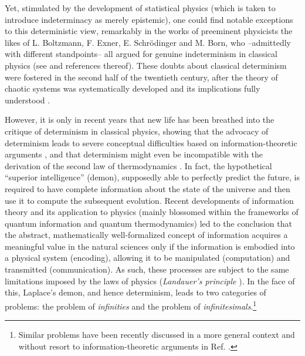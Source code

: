 \documentclass[aps,prl,twocolumn,showpacs,superscriptaddress,groupedaddress, nofootinbib]{revtex4-1}
\begin{document}
Yet, stimulated by the development of statistical physics (which is taken to introduce indeterminacy as merely epistemic), one could find notable exceptions to this deterministic view, remarkably in the works of preeminent physicists the likes of L. Boltzmann, F. Exner, E. Schr{\"o}dinger and M. Born, who --admittedly with different standpoints-- all argued for genuine indeterminism in classical physics (see \cite{delsanto} and references thereof). These doubts about classical determinism were fostered in the second half of the twentieth century, after the theory of chaotic systems was systematically developed and its implications fully understood \cite{ornstein, prigogine}.

However, it is only in recent years that new life has been breathed into the critique of determinism in classical physics, showing that the advocacy of determinism leads to severe conceptual difficulties based on information-theoretic arguments \cite{dowek, gisin1, blundell}, and that determinism might even be incompatible with the derivation of the second law of thermodynamics \cite{drossel}. In fact, the hypothetical ``superior intelligence'' (demon), supposedly able to perfectly predict the future, is required to have complete information about the state of the universe and then use it to compute the subsequent evolution. Recent developments of information theory and its application to physics (mainly blossomed within the frameworks of quantum information and quantum thermodynamics) led to the conclusion that the abstract, mathematically well-formalized concept of information acquires a meaningful value in the natural sciences only if the information is embodied into a physical system (encoding), allowing it to be manipulated (computation) and transmitted (communication). As such, these processes are subject to the same limitations imposed by the laws of physics (\emph{Landauer's principle} \cite{landauer}). In the face of this, Laplace's demon, and hence determinism, leads to two categories of problems: the problem of \emph{infinities} and the problem of \emph{infinitesimals}.\footnote{Similar problems have  been recently discussed in a more general context and without resort to information-theoretic arguments in Ref. \cite{ellisinf}.}
\end{document}
